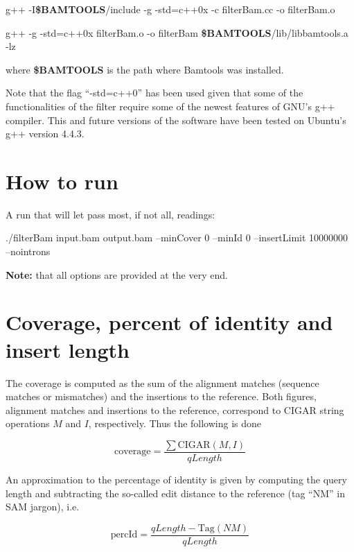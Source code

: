 \documentclass[11pt]{article}
\begin{document}
{\begin{enumerate}
\begin{flushleft}
	\item	
		g++ -I\textbf{\$BAMTOOLS}/include   -g   -std=c++0x  -c filterBam.cc -o filterBam.o \\
	\item	g++     -g -std=c++0x  filterBam.o -o filterBam \textbf{\$BAMTOOLS}/lib/libbamtools.a -lz  
\end{flushleft}
\end{enumerate}
\vphantom{Nothing}
where \textbf{\$BAMTOOLS} is the path where Bamtools was installed.

Note that the flag ``-std=c++0'' has been used given that some of the functionalities of the filter require 
some of the newest features of GNU's g++ compiler. This and future versions of the software have been tested 
on Ubuntu's g++ version 4.4.3.

\section{How to run}
A run that will let pass most, if not all, readings: 
\begin{flushleft}
./filterBam input.bam output.bam --minCover 0 --minId 0  --insertLimit 10000000 --nointrons
\end{flushleft}
\textbf{Note:} that all options are provided at the very end.

\section{Coverage, percent of identity and insert length}
The coverage is computed as the sum of the alignment matches (sequence matches or mismatches) and 
the insertions to the reference. Both figures, alignment matches and insertions to the reference, correspond 
to CIGAR string operations $M$ and $I$, respectively. Thus the following is done 

\begin{equation}
	\mathrm{coverage} = \frac{\sum\mathrm{CIGAR}\left(M,I\right)}{qLength}
\end{equation}

An approximation to the percentage of identity is given by computing the query length and subtracting the 
so-called edit distance to the reference (tag ``NM'' in SAM jargon), i.e.

\begin{equation}
	\mathrm{percId} = \frac{qLength - \mathrm{Tag}(NM)}{qLength}
\end{equation}

}
\end{document}
